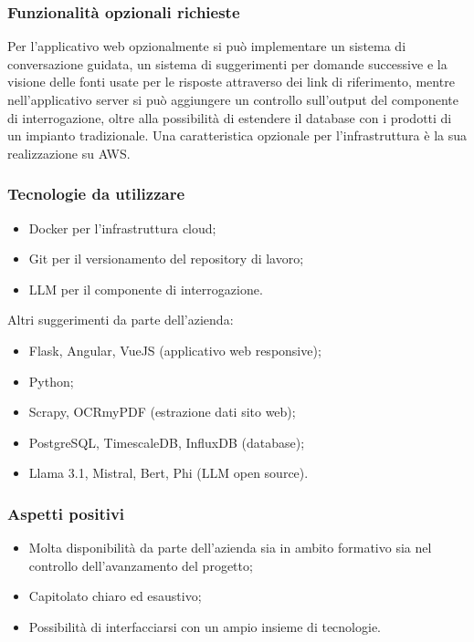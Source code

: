 \documentclass[10pt]{article}
\begin{document}
\subsubsection{Funzionalità opzionali richieste}
Per l’applicativo web opzionalmente si può implementare un sistema di conversazione guidata, un sistema di suggerimenti per domande successive e la visione delle fonti usate per le risposte attraverso dei link di riferimento, mentre nell’applicativo server si può aggiungere un controllo sull’output del componente di interrogazione, oltre alla possibilità di estendere il database con i prodotti di un impianto tradizionale.
Una caratteristica opzionale per l’infrastruttura è la sua realizzazione su AWS.

\subsubsection{Tecnologie da utilizzare}
\begin{itemize}
\item Docker per l’infrastruttura cloud;
\item Git per il versionamento del repository di lavoro;
\item LLM per il componente di interrogazione.
\end{itemize}
Altri suggerimenti da parte dell’azienda:
\begin{itemize}
\item Flask, Angular, VueJS (applicativo web responsive);
\item Python;
\item Scrapy, OCRmyPDF (estrazione dati sito web);
\item PostgreSQL, TimescaleDB, InfluxDB (database);
\item Llama 3.1, Mistral, Bert, Phi (LLM open source).
\end{itemize}

\subsubsection{Aspetti positivi}
\begin{itemize}
    \item Molta disponibilità da parte dell’azienda sia in ambito formativo sia nel controllo dell’avanzamento del progetto;
\item Capitolato chiaro ed esaustivo;
\item Possibilità di interfacciarsi con un ampio insieme di tecnologie.

\end{itemize}
\end{document}
